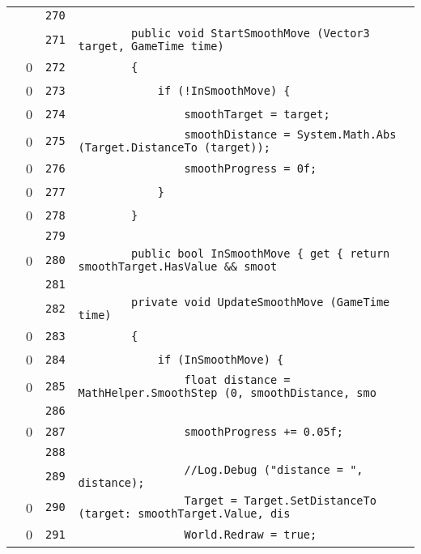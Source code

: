 \documentclass[a4paper,10pt]{article}
\begin{document}
\begin{longtable}[l]{lrrl}
\cellcolor{gray} &  & \verb~270~ & \verb~~\\
\cellcolor{gray} &  & \verb~271~ & \verb~        public void StartSmoothMove (Vector3 target, GameTime time)~\\
\cellcolor{red} & 0 & \verb~272~ & \verb~        {~\\
\cellcolor{red} & 0 & \verb~273~ & \verb~            if (!InSmoothMove) {~\\
\cellcolor{red} & 0 & \verb~274~ & \verb~                smoothTarget = target;~\\
\cellcolor{red} & 0 & \verb~275~ & \verb~                smoothDistance = System.Math.Abs (Target.DistanceTo (target));~\\
\cellcolor{red} & 0 & \verb~276~ & \verb~                smoothProgress = 0f;~\\
\cellcolor{red} & 0 & \verb~277~ & \verb~            }~\\
\cellcolor{red} & 0 & \verb~278~ & \verb~        }~\\
\cellcolor{gray} &  & \verb~279~ & \verb~~\\
\cellcolor{red} & 0 & \verb~280~ & \verb~        public bool InSmoothMove { get { return smoothTarget.HasValue && smoot~\\
\cellcolor{gray} &  & \verb~281~ & \verb~~\\
\cellcolor{gray} &  & \verb~282~ & \verb~        private void UpdateSmoothMove (GameTime time)~\\
\cellcolor{red} & 0 & \verb~283~ & \verb~        {~\\
\cellcolor{red} & 0 & \verb~284~ & \verb~            if (InSmoothMove) {~\\
\cellcolor{red} & 0 & \verb~285~ & \verb~                float distance = MathHelper.SmoothStep (0, smoothDistance, smo~\\
\cellcolor{gray} &  & \verb~286~ & \verb~~\\
\cellcolor{red} & 0 & \verb~287~ & \verb~                smoothProgress += 0.05f;~\\
\cellcolor{gray} &  & \verb~288~ & \verb~~\\
\cellcolor{gray} &  & \verb~289~ & \verb~                //Log.Debug ("distance = ", distance);~\\
\cellcolor{red} & 0 & \verb~290~ & \verb~                Target = Target.SetDistanceTo (target: smoothTarget.Value, dis~\\
\cellcolor{red} & 0 & \verb~291~ & \verb~                World.Redraw = true;~\\

\end{longtable}
\end{document}
